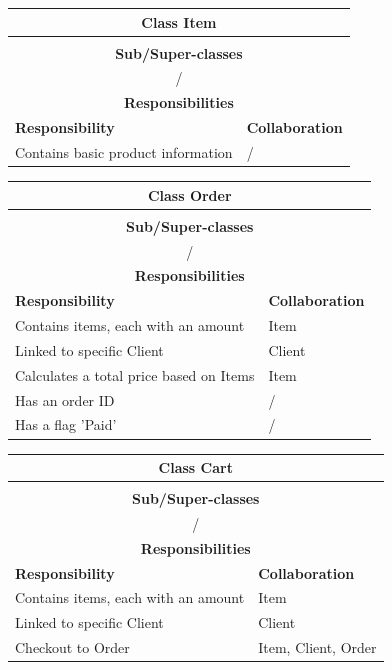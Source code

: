 \documentclass[•]{article}
\begin{document}
\begin{table}
\begin{tabular}{|l||l|}
\hline
\multicolumn{2}{|c|}{ Class \textbf{Item} }\\ \hline
\multicolumn{2}{|c|}{}\\ \hline
\multicolumn{2}{|c|}{ \textbf{Sub/Super-classes} }\\ \hline
\multicolumn{2}{|c|}{/} \\ \hline
\multicolumn{2}{|c|}{ \textbf{Responsibilities}}\\ \hline
\textbf{Responsibility} & \textbf{Collaboration} \\ \hline
Contains basic product information & / \\ \hline
\end{tabular}

\begin{tabular}{|l||l|}
\hline
\multicolumn{2}{|c|}{ Class \textbf{Order} }\\ \hline
\multicolumn{2}{|c|}{}\\ \hline
\multicolumn{2}{|c|}{ \textbf{Sub/Super-classes} }\\ \hline
\multicolumn{2}{|c|}{/} \\ \hline
\multicolumn{2}{|c|}{ \textbf{Responsibilities}}\\ \hline
\textbf{Responsibility} & \textbf{Collaboration} \\ \hline
Contains items, each with an amount & Item \\ \hline
Linked to specific Client & Client \\ \hline
Calculates a total price based on Items & Item \\ \hline
Has an order ID & / \\ \hline
Has a flag 'Paid' & / \\ \hline
\end{tabular}

\begin{tabular}{|l||l|}
\hline
\multicolumn{2}{|c|}{ Class \textbf{Cart} }\\ \hline
\multicolumn{2}{|c|}{}\\ \hline
\multicolumn{2}{|c|}{ \textbf{Sub/Super-classes} }\\ \hline
\multicolumn{2}{|c|}{/} \\ \hline
\multicolumn{2}{|c|}{ \textbf{Responsibilities}}\\ \hline
\textbf{Responsibility} & \textbf{Collaboration} \\ \hline
Contains items, each with an amount & Item \\ \hline
Linked to specific Client & Client \\ \hline
Checkout to Order & Item, Client, Order \\ \hline
\end{tabular}


\end{table}
\end{document}
